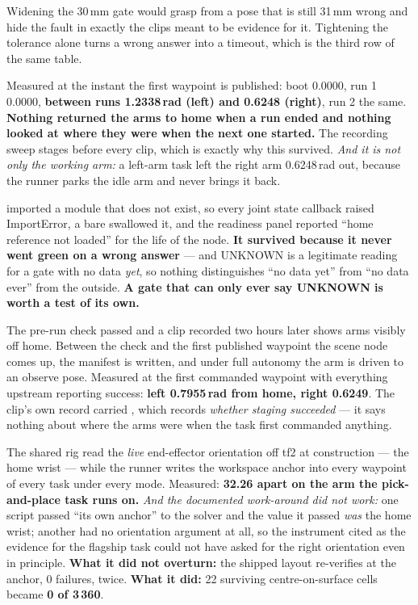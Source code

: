 {Widening the 30\,mm gate would grasp from a pose that is still 31\,mm wrong and
hide the fault in exactly the clips meant to be evidence for it. Tightening the
tolerance alone turns a wrong answer into a timeout, which is the third row of
the same table.}

{Measured at the instant the first waypoint is published: boot 0.0000, run 1
0.0000, \textbf{between runs 1.2338\,rad (left) and 0.6248 (right)}, run 2 the
same. \textbf{Nothing returned the arms to home when a run ended and nothing
looked at where they were when the next one started.} The recording sweep stages
before every clip, which is exactly why this survived. \textit{And it is not only
the working arm:} a left-arm task left the right arm 0.6248\,rad out, because the
runner parks the idle arm and never brings it back.}

{ imported a module that does not exist, so every joint
state callback raised ImportError, a bare  swallowed it, and the
readiness panel reported ``home reference not loaded'' for the life of the node.
\textbf{It survived because it never went green on a wrong answer} --- and
UNKNOWN is a legitimate reading for a gate with no data \emph{yet}, so nothing
distinguishes ``no data yet'' from ``no data ever'' from the outside.
\textbf{A gate that can only ever say UNKNOWN is worth a test of its own.}}

{The pre-run check passed and a clip recorded two hours later shows arms
visibly off home. Between the check and the first published waypoint the scene
node comes up, the manifest is written, and under full autonomy the arm is
driven to an observe pose. Measured at the first commanded waypoint with
everything upstream reporting success: \textbf{left 0.7955\,rad from home, right
0.6249}. The clip's own record carried , which
records \emph{whether staging succeeded} --- it says nothing about where the
arms were when the task first commanded anything.}

{The shared rig read the \emph{live} end-effector orientation off tf2 at
construction --- the home wrist --- while the runner writes the workspace anchor
into every waypoint of every task under every mode. Measured: \textbf{32.26\dg{}
apart on the arm the pick-and-place task runs on.} \textit{And the documented
work-around did not work:} one script passed ``its own anchor'' to the solver
and the value it passed \emph{was} the home wrist; another had no orientation
argument at all, so the instrument cited as the evidence for the flagship task
could not have asked for the right orientation even in principle.
\textbf{What it did not overturn:} the shipped layout re-verifies at the anchor,
0 failures, twice. \textbf{What it did:} 22 surviving centre-on-surface cells
became \textbf{0 of 3\,360}.}


